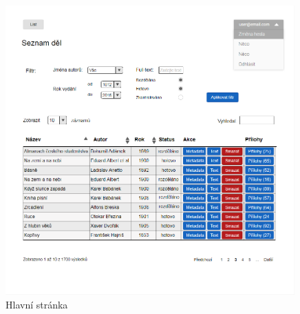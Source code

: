 \documentclass[thesis=B,czech]{FITthesis}[2012/06/26]
\begin{document}
    \begin {figure}[H]\centering
        \includegraphics[width=0.991\textwidth]{images/main}
        \caption {Hlavní stránka}
        \label {fig:main}
    \end{figure}
\end{document}
